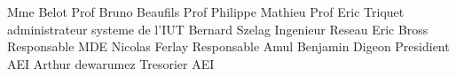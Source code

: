 
Mme Belot Prof
Bruno Beaufils Prof
Philippe Mathieu Prof
Eric Triquet  administrateur systeme de l'IUT
Bernard Szelag Ingenieur Reseau
Eric Bross Responsable MDE
Nicolas Ferlay Responsable Amul
Benjamin Digeon Presidient AEI
Arthur dewarumez Tresorier AEI
